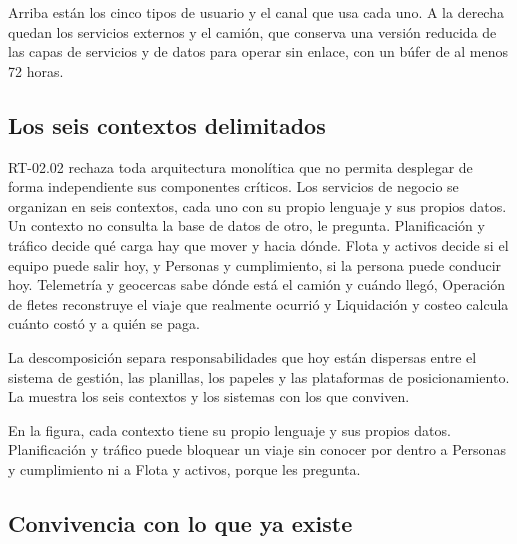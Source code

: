 
Arriba están los cinco tipos de usuario y el canal que usa cada uno. A la derecha quedan los servicios
externos y el camión, que conserva una versión reducida de las capas de servicios y de datos para
operar sin enlace, con un búfer de al menos 72 horas.

\subsection{Los seis contextos delimitados}\label{sec:4-contextos}

RT-02.02 rechaza toda arquitectura monolítica que no permita desplegar de forma independiente sus
componentes críticos. Los servicios de negocio se organizan en seis contextos, cada uno con su propio
lenguaje y sus propios datos. Un contexto no consulta la base de datos de otro, le pregunta.
Planificación y tráfico decide qué carga hay que mover y hacia dónde. Flota y activos decide si el
equipo puede salir hoy, y Personas y cumplimiento, si la persona puede conducir hoy. Telemetría y
geocercas sabe dónde está el camión y cuándo llegó, Operación de fletes reconstruye el viaje que
realmente ocurrió y Liquidación y costeo calcula cuánto costó y a quién se paga.

La descomposición separa responsabilidades que hoy están dispersas entre el sistema de gestión, las
planillas, los papeles y las plataformas de posicionamiento. La  muestra los seis
contextos y los sistemas con los que conviven.


En la figura, cada contexto tiene su propio lenguaje y sus propios datos. Planificación y tráfico puede
bloquear un viaje sin conocer por dentro a Personas y cumplimiento ni a Flota y activos, porque les
pregunta.

\subsection{Convivencia con lo que ya existe}\label{sec:4-convivencia}

